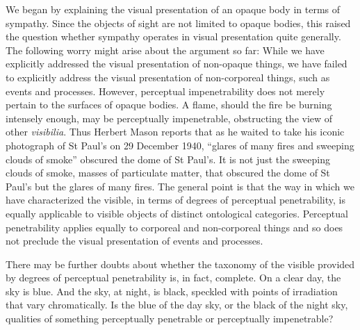 We began by explaining the visual presentation of an opaque body in terms of sympathy. Since the objects of sight are not limited to opaque bodies, this raised the question whether sympathy operates in visual presentation quite generally. The following worry might arise about the argument so far: While we have explicitly addressed the visual presentation of non-opaque things, we have failed to explicitly address the visual presentation of non-corporeal things, such as events and processes. However, perceptual impenetrability does not merely pertain to the surfaces of opaque bodies. A flame, should the fire be burning intensely enough, may be perceptually impenetrable, obstructing the view of other \emph{visibilia}. Thus Herbert Mason reports that as he waited to take his iconic photograph of St Paul's on 29 December 1940, ``glares of many fires and sweeping clouds of smoke'' obscured the dome of St Paul's. It is not just the sweeping clouds of smoke, masses of particulate matter, that obscured the dome of St Paul's but the glares of many fires. The general point is that the way in which we have characterized the visible, in terms of degrees of perceptual penetrability, is equally applicable to visible objects of distinct ontological categories. Perceptual penetrability applies equally to corporeal and non-corporeal things and so does not preclude the visual presentation of events and processes.

There may be further doubts about whether the taxonomy of the visible provided by degrees of perceptual penetrability is, in fact, complete. On a clear day, the sky is blue. And the sky, at night, is black, speckled with points of irradiation that vary chromatically. Is the blue of the day sky, or the black of the night sky, qualities of something perceptually penetrable or perceptually impenetrable?

